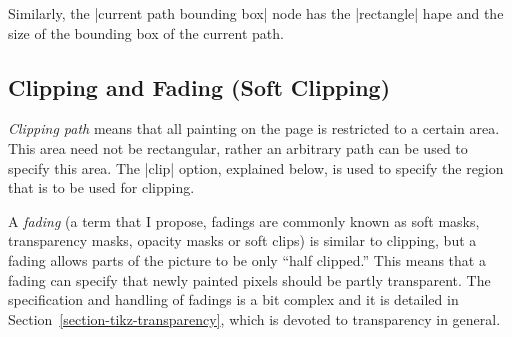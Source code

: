 Similarly, the |current path bounding box| node has the |rectangle|
hape and the size of the bounding box of the current path.


\begin{codeexample}[]
\end{codeexample}



\subsection{Clipping and Fading (Soft Clipping)}

\emph{Clipping path} means that all painting on the page is restricted
to a certain area. This area need not be rectangular, rather an
arbitrary path can be used to specify this area. The |clip| option,
explained below, is used to specify the region that is to be used for
clipping.

A \emph{fading} (a term that I propose, fadings are commonly known
as soft masks, transparency masks, opacity masks or soft clips) is
similar to clipping, but a fading allows parts of the picture to be
only ``half clipped.'' This means that a fading can specify that newly
painted pixels should be partly transparent. The specification
and handling of fadings is a bit complex and it is detailed in
Section~\ref{section-tikz-transparency}, which is devoted to
transparency in general.

